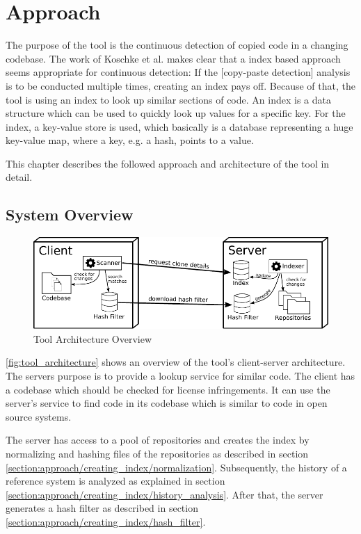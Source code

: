 
\chapter{Approach}\label{chapter:approach}
The purpose of the tool is the continuous detection of copied code in a changing codebase.
The work of Koschke et al. makes clear that a index based approach seems appropriate for continuous detection:
\glqq If the [copy-paste detection] analysis is to be conducted multiple times, creating an index pays off\grqq \cite{koschke2014large}.
Because of that, the tool is using an index to look up similar sections of code.
An index is a data structure which can be used to quickly look up values for a specific key.
For the index, a key-value store is used, which basically is a database representing a huge key-value map, where a key, e.g. a hash, points to a value.

This chapter describes the followed approach and architecture of the tool in detail.

\section{System Overview}
\begin{figure}[h]
	\centering
	\includegraphics{figures/architecture_overview.pdf}
	\caption{Tool Architecture Overview}\label{fig:tool_architecture}
\end{figure}
\autoref{fig:tool_architecture} shows an overview of the tool's client-server architecture.
The servers purpose is to provide a lookup service for similar code.
The client has a codebase which should be checked for license infringements.
It can use the server's service to find code in its codebase which is similar to code in open source systems.

The server has access to a pool of repositories and creates the index by normalizing and hashing files of the repositories as described in section \ref{section:approach/creating_index/normalization}.
Subsequently, the history of a reference system is analyzed as explained in section \ref{section:approach/creating_index/history_analysis}.
After that, the server generates a hash filter as described in section \ref{section:approach/creating_index/hash_filter}.

